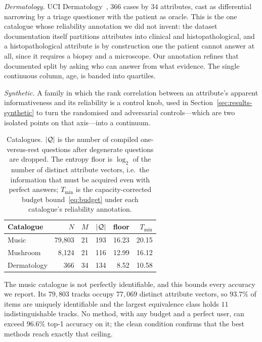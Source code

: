 \emph{Dermatology.} UCI Dermatology~\cite{uci,guvenir1998}, $366$ cases by $34$ attributes, cast as
differential narrowing by a triage questioner with the patient as oracle. This
is the one catalogue whose reliability annotation we did not invent: the
dataset documentation itself partitions attributes into clinical and
histopathological, and a histopathological attribute is by construction one the
patient cannot answer at all, since it requires a biopsy and a microscope. Our
annotation refines that documented split by asking who can answer from what
evidence. The single continuous column, age, is banded into quartiles.

\emph{Synthetic.} A family in which the rank correlation between an attribute's
apparent informativeness and its reliability is a control knob, used in
Section~\ref{sec:results-synthetic} to turn the randomised and adversarial
controls---which are two isolated points on that axis---into a continuum.

\begin{table}[t]
\caption{Catalogues. $|\mathcal{Q}|$ is the number of compiled one-versus-rest
questions after degenerate questions are dropped. The entropy floor is
$\log_2$ of the number of distinct attribute vectors, i.e.\ the information
that must be acquired even with perfect answers; $T_{\min}$ is the
capacity-corrected budget bound~\eqref{eq:budget} under each catalogue's
reliability annotation.}
\label{tab:catalogues}
\centering
\footnotesize
\begin{tabular}{@{}lrrrrr@{}}
\toprule
\textbf{Catalogue} & \textbf{$N$} & \textbf{$M$} & \textbf{$|\mathcal{Q}|$} &
\textbf{floor} & \textbf{$T_{\min}$} \\
\midrule
Music        & 79{,}803 & 21 & 193 & 16.23 & 20.15 \\
Mushroom     & 8{,}124  & 21 & 116 & 12.99 & 16.12 \\
Dermatology  & 366      & 34 & 134 & 8.52  & 10.58 \\
\bottomrule
\end{tabular}
\end{table}

The music catalogue is not perfectly identifiable, and this bounds every
accuracy we report. Its $79{,}803$ tracks occupy $77{,}069$ distinct attribute
vectors, so $93.7\%$ of items are uniquely identifiable and the largest
equivalence class holds $11$ indistinguishable tracks. No method, with any
budget and a perfect user, can exceed $96.6\%$ top-1 accuracy on it; the clean
condition confirms that the best methods reach exactly that ceiling.

